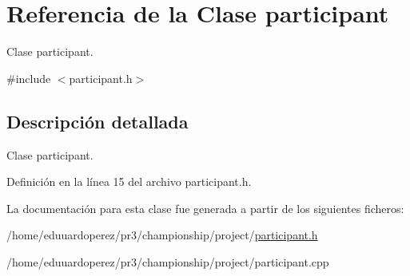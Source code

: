 \hypertarget{classparticipant}{}\section{Referencia de la Clase participant}
\label{classparticipant}


Clase participant.  




{\ttfamily \#include $<$participant.\+h$>$}



\subsection{Descripción detallada}
Clase participant. 

Definición en la línea 15 del archivo participant.\+h.



La documentación para esta clase fue generada a partir de los siguientes ficheros\+:\begin{DoxyCompactItemize}
\item 
/home/eduuardoperez/pr3/championship/project/\hyperlink{participant_8h}{participant.\+h}\item 
/home/eduuardoperez/pr3/championship/project/participant.\+cpp\end{DoxyCompactItemize}
